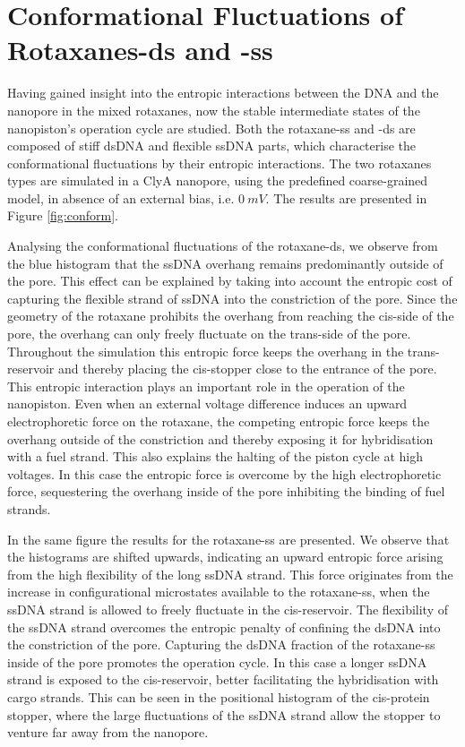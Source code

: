 \section{Conformational Fluctuations of Rotaxanes-ds and -ss}

Having gained insight into the entropic interactions between the DNA and the
nanopore in the mixed rotaxanes, now the stable intermediate states of the nanopiston's
operation cycle are
studied. Both the rotaxane-ss and -ds are composed of stiff dsDNA and flexible ssDNA
parts, which characterise the conformational fluctuations by their entropic
interactions.
The two rotaxanes types are simulated in a ClyA nanopore, using the predefined
coarse-grained
model, in absence of an external bias, i.e.  $0\ mV$. The results are presented in Figure
\ref{fig:conform}.

Analysing the conformational fluctuations of the rotaxane-ds, we observe from the blue
histogram that the ssDNA
overhang remains predominantly outside of the pore. This effect can be explained by
taking
into account the entropic cost of capturing the flexible strand of ssDNA into the
constriction of the pore. Since the geometry of the rotaxane prohibits the overhang from
reaching the cis-side of the pore, the overhang can only freely fluctuate on the
trans-side of the pore. Throughout the simulation this entropic force keeps the overhang
in the trans-reservoir and thereby placing the cis-stopper close to the entrance
of the pore. This entropic interaction plays an important role in the operation of the
nanopiston. Even when an external voltage difference induces an upward electrophoretic
force on the rotaxane, the competing entropic force keeps the overhang outside of the
constriction and thereby exposing it for hybridisation with a fuel strand. This also
explains the halting of the piston cycle at high voltages. In this case the entropic
force is overcome by the high electrophoretic force, sequestering the overhang inside
of the pore inhibiting the binding of fuel strands.

In the same figure the results for the rotaxane-ss are presented. We observe that the
histograms are shifted upwards, indicating an upward entropic force arising from the high
flexibility of the long ssDNA strand. This force originates from the increase in
configurational microstates available to the rotaxane-ss, when the ssDNA strand is
allowed to freely fluctuate in the
cis-reservoir. The flexibility of the ssDNA strand overcomes the entropic penalty of
confining the dsDNA into the constriction of the pore. Capturing the dsDNA fraction of
the
rotaxane-ss inside of the pore promotes the
operation cycle. In this case a longer ssDNA strand is exposed to the cis-reservoir,
better facilitating the hybridisation with cargo strands. This can be seen in the
positional histogram of the cis-protein stopper, where the large fluctuations of the
ssDNA strand allow the stopper to venture far away from the nanopore.

